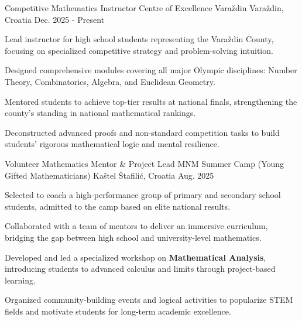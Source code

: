 

\begin{cventries}

  \cventry
    {Competitive Mathematics Instructor} %
    {Centre of Excellence Varaždin} %
    {Varaždin, Croatia} %
    {Dec. 2025 - Present} %
    {
      \begin{cvitems} %
        \item {Lead instructor for high school students representing the Varaždin County, focusing on specialized competitive strategy and problem-solving intuition.}
        \item {Designed comprehensive modules covering all major Olympic disciplines: Number Theory, Combinatorics, Algebra, and Euclidean Geometry.}
        \item {Mentored students to achieve top-tier results at national finals, strengthening the county's standing in national mathematical rankings.}
        \item {Deconstructed advanced proofs and non-standard competition tasks to build students' rigorous mathematical logic and mental resilience.}
      \end{cvitems}
      \vspace{4mm}
    }

  \cventry
    {Volunteer Mathematics Mentor \& Project Lead} %
    {MNM Summer Camp (Young Gifted Mathematicians)} %
    {Kaštel Štafilić, Croatia} %
    {Aug. 2025} %
    {
      \begin{cvitems} %
        \item {Selected to coach a high-performance group of primary and secondary school students, admitted to the camp based on elite national results.}
        \item {Collaborated with a team of mentors to deliver an immersive curriculum, bridging the gap between high school and university-level mathematics.}
        \item {Developed and led a specialized workshop on \textbf{Mathematical Analysis}, introducing students to advanced calculus and limits through project-based learning.}
        \item {Organized community-building events and logical activities to popularize STEM fields and motivate students for long-term academic excellence.}
      \end{cvitems}
      \vspace{4mm}
    }


\end{cventries}
